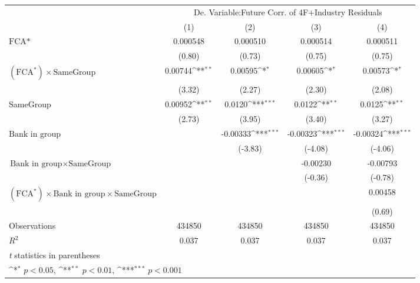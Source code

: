 {
\def\sym#1{\ifmmode^{#1}\else\(^{#1}\)\fi}
\begin{tabular}{l*{4}{c}}
\hline\hline
                &\multicolumn{4}{c}{De. Variable:Future  Corr. of 4F+Industry Residuals}    \\\cmidrule(lr){2-5}
                &\multicolumn{1}{c}{(1)}         &\multicolumn{1}{c}{(2)}         &\multicolumn{1}{c}{(3)}         &\multicolumn{1}{c}{(4)}         \\
\hline
$ \text{FCA*} $ & 0.000548         & 0.000510         & 0.000514         & 0.000511         \\
                &   (0.80)         &   (0.73)         &   (0.75)         &   (0.75)         \\
[1em]
 $ (\text{FCA}^*) \times {\text{SameGroup} }  $ &  0.00744\sym{**} &  0.00595\sym{*}  &  0.00605\sym{*}  &  0.00573\sym{*}  \\
                &   (3.32)         &   (2.27)         &   (2.30)         &   (2.08)         \\
[1em]
SameGroup       &  0.00952\sym{**} &   0.0120\sym{***}&   0.0122\sym{**} &   0.0125\sym{**} \\
                &   (2.73)         &   (3.95)         &   (3.40)         &   (3.27)         \\
[1em]
 $  {\text{Bank in group} } $ &                  & -0.00333\sym{***}& -0.00323\sym{***}& -0.00324\sym{***}\\
                &                  &  (-3.83)         &  (-4.08)         &  (-4.06)         \\
[1em]
 $ {\text{Bank in group}  } \times {\text{SameGroup}}  $ &                  &                  & -0.00230         & -0.00793         \\
                &                  &                  &  (-0.36)         &  (-0.78)         \\
[1em]
 $ (\text{FCA}^*) \times {\text{Bank in group} }  \times {\text{SameGroup}}$ &                  &                  &                  &  0.00458         \\
                &                  &                  &                  &   (0.69)         \\
\hline
Observations    &   434850         &   434850         &   434850         &   434850         \\
\(R^{2}\)       &    0.037         &    0.037         &    0.037         &    0.037         \\
\hline\hline
\multicolumn{5}{l}{\footnotesize \textit{t} statistics in parentheses}\\
\multicolumn{5}{l}{\footnotesize \sym{*} \(p<0.05\), \sym{**} \(p<0.01\), \sym{***} \(p<0.001\)}\\
\end{tabular}
}
